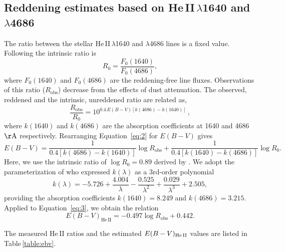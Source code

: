 \documentclass[]{aastex63}
\begin{document}
\subsection{Reddening estimates based on He\,II\,$\lambda$1640 and $\lambda$4686}\label{sect:red_heii}
The ratio between the stellar He\,II\,$\lambda$1640 and $\lambda$4686 lines is a fixed value. Following \citet{leitherer_he_2019} the intrinsic ratio is 
\begin{equation}
    R_0 = \frac{F_0(1640)}{F_0(4686)},
\end{equation}
where $F_0(1640)$ and $F_0(4686)$ are the reddening-free line fluxes.
Observations of this ratio ($R_{\mathrm{obs}}$) decrease from the effects of dust attenuation. 
The observed, reddened and the intrinsic, unreddened ratio are related as, 
\begin{equation}
    \frac{R_{\mathrm{obs}}}{R_{\mathrm{0}}} = 10^{0.4\, E(B-V) [k(4686) - k(1640)]}\, , \label{eq:2}
\end{equation}
where $k(1640)$ and $k(4686)$ are the absorption coefficients at 1640 and 4686 ${\rm \AA}$ respectively. Rearranging Equation~\ref{eq:2} for $E(B-V)$ gives
\begin{equation}\label{eq:3}
    E(B-V) = \frac{1}{0.4 [k(4686) - k(1640)]}\log R_{\mathrm{obs}} + \frac{1}{0.4 [k(1640) - k(4686)]}\log R_{0}.  
\end{equation}
Here, we use the intrinsic ratio of $\log R_0 = 0.89$ derived by \citet{leitherer_he_2019}. We adopt the parameterization of \citet{reddy_mosdef_2015} who expressed $k(\lambda)$ as a 3rd-order polynomial
\begin{equation}\label{eq:4}
    k(\lambda) = -5.726 + \frac{4.004}{\lambda} - \frac{0.525}{\lambda^2} + \frac{0.029}{\lambda^3} + 2.505,
\end{equation}
providing the absorption coefficients $k(1640)=8.249$ and $k(4686)=3.215$. 
Applied to Equation~\ref{eq:3}, we obtain the relation 
\begin{equation}\label{eq:5}
    E(B-V)_{\mathrm{He\, II}} = - 0.497 \log R_{\mathrm{obs}} + 0.442.
\end{equation}

The measured He\,II ratios and the estimated ${E(B-V)_{\rm He\,II}}$ values are listed in Table\,\ref{table:ebv}.
\end{document}
